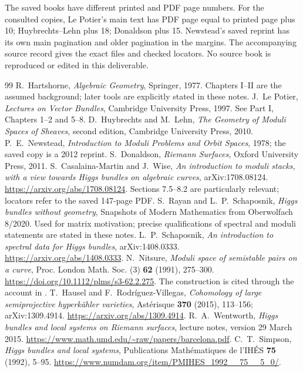 \documentclass[11pt,a4paper]{article}
\numberwithin{equation}{section}
\theoremstyle{definition}
\begin{document}
The saved books have different printed and PDF page numbers.
For the consulted copies, Le Potier's main text has PDF page equal
to printed page plus 10; Huybrechts--Lehn plus 18; Donaldson plus 15.
Newstead's saved reprint has its own main pagination and older
pagination in the margins. The accompanying source record gives
the exact files and checked locators. No source book is reproduced
or edited in this deliverable.

\begin{thebibliography}{99}
 R.~Hartshorne, \emph{Algebraic Geometry}, Springer,
1977. Chapters I--II are the assumed background; later tools are
explicitly stated in these notes.
 J.~Le Potier, \emph{Lectures on Vector Bundles},
Cambridge University Press, 1997. See Part I, Chapters 1--2 and 5--8.
 D.~Huybrechts and M.~Lehn, \emph{The Geometry of Moduli
Spaces of Sheaves}, second edition, Cambridge University Press, 2010.
 P.~E.~Newstead, \emph{Introduction to Moduli Problems
and Orbit Spaces}, 1978; the saved copy is a 2012 reprint.
 S.~Donaldson, \emph{Riemann Surfaces}, Oxford
University Press, 2011.
 S.~Casalaina-Martin and J.~Wise,
\emph{An introduction to moduli stacks, with a view towards Higgs
bundles on algebraic curves}, arXiv:1708.08124.
\url{https://arxiv.org/abs/1708.08124}. Sections 7.5--8.2 are
particularly relevant; locators refer to the saved 147-page PDF.
 S.~Rayan and L.~P.~Schaposnik, \emph{Higgs bundles
without geometry}, Snapshots of Modern Mathematics from Oberwolfach
8/2020. Used for matrix motivation; precise qualifications of
spectral and moduli statements are stated in these notes.
 L.~P.~Schaposnik, \emph{An introduction to spectral
data for Higgs bundles}, arXiv:1408.0333.
\url{https://arxiv.org/abs/1408.0333}.
 N.~Nitsure, \emph{Moduli space of semistable pairs
on a curve}, Proc. London Math. Soc. (3) \textbf{62} (1991), 275--300.
\url{https://doi.org/10.1112/plms/s3-62.2.275}.
The construction is cited through the account in \cite[\S7.7]{CMW}.
 T.~Hausel and F.~Rodríguez-Villegas,
\emph{Cohomology of large semiprojective hyperkähler varieties},
Astérisque \textbf{370} (2015), 113--156; arXiv:1309.4914.
\url{https://arxiv.org/abs/1309.4914}.
 R.~A.~Wentworth, \emph{Higgs bundles and local
systems on Riemann surfaces}, lecture notes, version 29 March 2015.
\url{https://www.math.umd.edu/~raw/papers/barcelona.pdf}.
 C.~T.~Simpson, \emph{Higgs bundles and local systems},
Publications Mathématiques de l'IHÉS \textbf{75} (1992), 5--95.
\url{https://www.numdam.org/item/PMIHES_1992__75__5_0/}.
\end{thebibliography}
\end{document}
